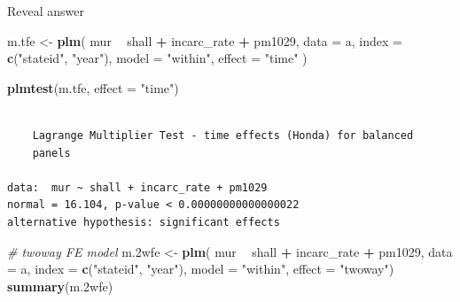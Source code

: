 \documentclass[]{article}
\newenvironment{Shaded}{\begin{snugshade}}{\end{snugshade}}
\newcommand{\KeywordTok}[1]{\textcolor[rgb]{0.13,0.29,0.53}{\textbf{#1}}}
\newcommand{\DataTypeTok}[1]{\textcolor[rgb]{0.13,0.29,0.53}{#1}}
\newcommand{\StringTok}[1]{\textcolor[rgb]{0.31,0.60,0.02}{#1}}
\newcommand{\CommentTok}[1]{\textcolor[rgb]{0.56,0.35,0.01}{\textit{#1}}}
\newcommand{\OperatorTok}[1]{\textcolor[rgb]{0.81,0.36,0.00}{\textbf{#1}}}
\newcommand{\NormalTok}[1]{#1}
\theoremstyle{definition}
\theoremstyle{definition}
\theoremstyle{definition}
\theoremstyle{remark}
\begin{document}
 Reveal answer

\begin{Shaded}
\begin{Highlighting}[]
\NormalTok{m.tfe <-}\StringTok{ }\KeywordTok{plm}\NormalTok{(}
\NormalTok{  mur }\OperatorTok{~}\StringTok{ }\NormalTok{shall }\OperatorTok{+}\StringTok{ }\NormalTok{incarc_rate }\OperatorTok{+}\StringTok{ }\NormalTok{pm1029,}
  \DataTypeTok{data =}\NormalTok{ a,}
  \DataTypeTok{index =} \KeywordTok{c}\NormalTok{(}\StringTok{"stateid"}\NormalTok{, }\StringTok{"year"}\NormalTok{),}
  \DataTypeTok{model =} \StringTok{"within"}\NormalTok{,}
  \DataTypeTok{effect =} \StringTok{"time"}
\NormalTok{  )}

\KeywordTok{plmtest}\NormalTok{(m.tfe, }\DataTypeTok{effect =} \StringTok{"time"}\NormalTok{)}
\end{Highlighting}
\end{Shaded}

\begin{verbatim}

    Lagrange Multiplier Test - time effects (Honda) for balanced
    panels

data:  mur ~ shall + incarc_rate + pm1029
normal = 16.104, p-value < 0.00000000000000022
alternative hypothesis: significant effects
\end{verbatim}

\begin{Shaded}
\begin{Highlighting}[]
\CommentTok{# twoway FE model}
\NormalTok{m.2wfe <-}\StringTok{ }\KeywordTok{plm}\NormalTok{(}
\NormalTok{  mur }\OperatorTok{~}\StringTok{ }\NormalTok{shall }\OperatorTok{+}\StringTok{ }\NormalTok{incarc_rate }\OperatorTok{+}\StringTok{ }\NormalTok{pm1029,}
  \DataTypeTok{data =}\NormalTok{ a,}
  \DataTypeTok{index =} \KeywordTok{c}\NormalTok{(}\StringTok{"stateid"}\NormalTok{, }\StringTok{"year"}\NormalTok{),}
  \DataTypeTok{model =} \StringTok{"within"}\NormalTok{,}
  \DataTypeTok{effect =} \StringTok{"twoway"}\NormalTok{)}
\KeywordTok{summary}\NormalTok{(m.2wfe)}
\end{Highlighting}
\end{Shaded}
\end{document}
